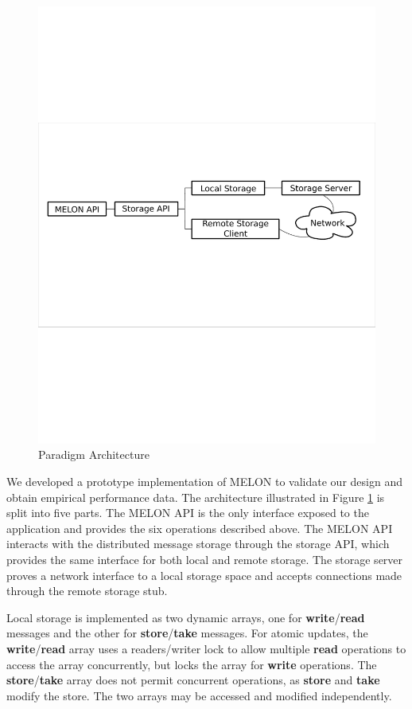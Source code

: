 \documentclass{llncs}
\begin{document}
\begin{figure}
\centering
\includegraphics[scale = .50, clip, trim = 10px 350px 10px 312px]{figures/paradigm_arch.pdf}
\caption{Paradigm Architecture}
\label{fig:architecture}
\end{figure}

We developed a prototype implementation of MELON to validate our design and obtain empirical performance data. The architecture illustrated in Figure \ref{fig:architecture} is split into five parts. The MELON API is the only interface exposed to the application and provides the six operations described above. The MELON API interacts with the distributed message storage through the storage API, which provides the same interface for both local and remote storage. The storage server proves a network interface to a local storage space and accepts connections made through the remote storage stub.

Local storage is implemented as two dynamic arrays, one for \textbf{write}/\textbf{read} messages and the other for \textbf{store}/\textbf{take} messages. For atomic updates, the \textbf{write}/\textbf{read} array uses a readers/writer lock to allow multiple \textbf{read} operations to access the array concurrently, but locks the array for \textbf{write} operations. The \textbf{store}/\textbf{take} array does not permit concurrent operations, as \textbf{store} and \textbf{take} modify the store. The two arrays may be accessed and modified independently.
\end{document}
